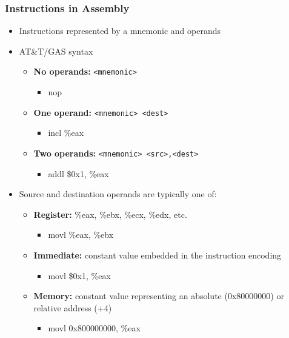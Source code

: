 \documentclass[11pt,xcolor=dvipsnames]{beamer}
\newcommand{\vs}{\vspace{0.5em}}
\begin{document}
\begin{frame}[fragile,t]
\frametitle{Instructions in Assembly}
\begin{itemize}
    \item Instructions represented by a mnemonic and operands
    \item AT\&T/GAS syntax
    \begin{itemize}
    \item {\bf No operands:} \verb+<mnemonic>+
    \begin{itemize}
        \item {\ttfamily nop}
    \end{itemize}
    \item {\bf One operand:} \verb+<mnemonic> <dest>+
    \begin{itemize}
        \item {\ttfamily incl \%eax}
    \end{itemize}
    \item {\bf Two operands:} \verb+<mnemonic> <src>,<dest>+
    \begin{itemize}
        \item {\ttfamily addl \$0x1, \%eax}
    \end{itemize}
    \end{itemize}
    \vs
    \pause
    \item Source and destination operands are typically one of:
    \begin{itemize}
        \item {\bf Register:} {\ttfamily \%eax, \%ebx, \%ecx, \%edx,} etc.
        \begin{itemize}
            \item {\ttfamily movl \%eax, \%ebx}
        \end{itemize}
        \item {\bf Immediate:} constant value embedded in the instruction encoding
        \begin{itemize}
            \item {\ttfamily movl \$0x1, \%eax}
        \end{itemize}
        \item {\bf Memory:} constant value representing an absolute (0x80000000) or relative address (+4)
        \begin{itemize}
            \item {\ttfamily movl 0x800000000, \%eax}
        \end{itemize}
    \end{itemize}
\end{itemize}
\end{frame}
\end{document}
